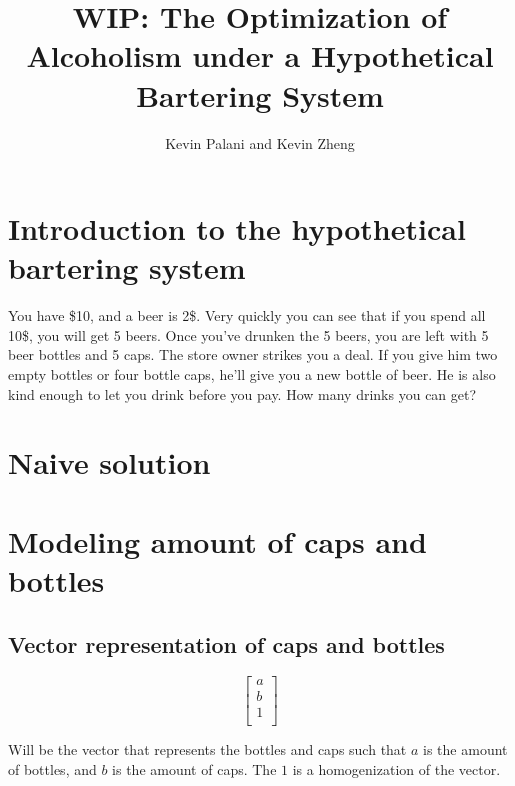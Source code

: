 \documentclass[letterpaper, 12pt]{article}
\title{WIP: The Optimization of Alcoholism under a Hypothetical Bartering System}
\author{Kevin Palani and Kevin Zheng}
\begin{document}
\maketitle
\tableofcontents
\section{Introduction to the hypothetical bartering system}
\par You have \$10, and a beer is 2\$.
Very quickly you can see that if you spend all 10\$, you will get 5 beers.
Once you've drunken the 5 beers, you are left with 5 beer bottles and 5 caps.
The store owner strikes you a deal.
If you give him two empty bottles or four bottle caps, he'll give you a new bottle of beer.
He is also kind enough to let you drink before you pay.
How many drinks you can get?
\section{Naive solution}

\section{Modeling amount of caps and bottles}
\subsection{Vector representation of caps and bottles}
\[
    \begin{bmatrix}
        a\\
        b\\
        1\\
    \end{bmatrix}
\]
\par Will be the vector that represents the bottles and caps such that $a$ is the amount of bottles, and $b$ is the amount of caps.
The $1$ is a homogenization of the vector.
\end{document}
